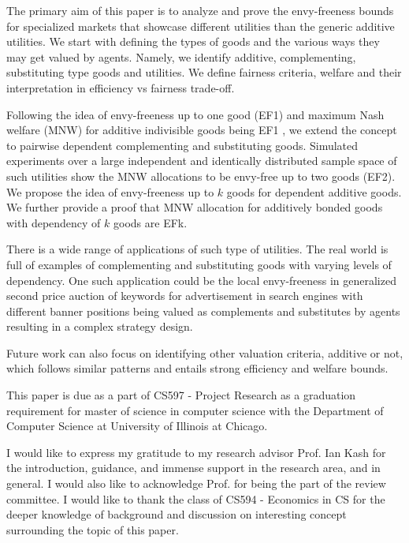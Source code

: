 The primary aim of this paper is to analyze and prove the envy-freeness bounds for specialized markets that showcase different utilities than the generic additive utilities. We start with defining the types of goods and the various ways they may get valued by agents. Namely, we identify additive, complementing, substituting type goods and utilities. We define fairness criteria, welfare and their interpretation in efficiency vs fairness trade-off. 

Following the idea of envy-freeness up to one good (EF1) and maximum Nash welfare (MNW) for additive indivisible goods being EF1 \cite{caragiannis2016unreasonable}, we extend the concept to pairwise dependent complementing and substituting goods. Simulated experiments over a large independent and identically distributed sample space of such utilities show the MNW allocations to be envy-free up to two goods (EF2). We propose the idea of envy-freeness up to $k$ goods for dependent additive goods. We further provide a proof that MNW allocation for additively bonded goods with depend\-ency of $k$ goods are EFk.

There is a wide range of applications of such type of utilities. The real world is full of examples of complementing and substituting goods with varying levels of dependency. One such application could be the local envy-freeness in generalized second price auction of keywords for advertisement in search engines \cite{edelman2007internet} with different banner positions being valued as complements and substitutes by agents resulting in a complex strategy design. 

Future work can also focus on identifying other valuation criteria, additive or not, which follows similar patterns and entails strong efficiency and welfare bounds.

\begin{acks}
This paper is due as a part of CS597 - Project Research as a graduation requirement for master of science in computer science with the Department of Computer Science at University of Illinois at Chicago.

I would like to express my gratitude to my research advisor Prof. Ian Kash for the introduction, guidance, and immense support in the research area, and in general. I would also like to acknowledge Prof.               for being the part of the review committee. I would like to thank the class of CS594 - Economics in CS for the deeper knowledge of background and discussion on interesting concept surrounding the topic of this paper.


\end{acks}